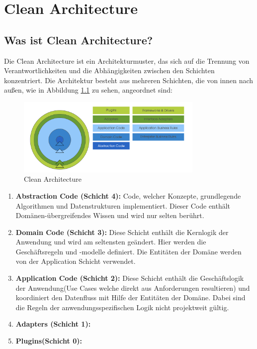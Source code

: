 \chapter{Clean Architecture}
\section{Was ist Clean Architecture?}
Die Clean Architecture ist ein Architekturmuster, das sich auf die Trennung von Verantwortlichkeiten und die Abhängigkeiten zwischen den Schichten konzentriert. Die Architektur besteht aus mehreren Schichten, die von innen nach außen, wie in Abbildung \ref{fig:cleanArchitecture} zu sehen, angeordnet sind:

\begin{figure}[h]
    \centering
    \includegraphics[width=0.8\textwidth]{Bilder/CA.png}
    \caption{Clean Architecture \cite{clean.2023}}
    \label{fig:cleanArchitecture}
\end{figure}

\begin{enumerate}
    \item \textbf{Abstraction Code (Schicht 4):} Code, welcher Konzepte, grundlegende Algorithmen und Datenstrukturen implementiert. Dieser Code enthält Domänen-übergreifendes Wissen und wird nur selten berührt.
    \item \textbf{Domain Code (Schicht 3):} Diese Schicht enthält die Kernlogik der Anwendung und wird am seltensten geändert. Hier werden die Geschäftsregeln und -modelle definiert. Die Entitäten der Domäne  werden von der Application Schicht verwendet.
    \item \textbf{Application Code (Schicht 2):} Diese Schicht enthält die Geschäftslogik der Anwendung(Use Cases welche direkt aus Anforderungen resultieren) und koordiniert den Datenfluss mit Hilfe der Entitäten der Domäne. Dabei sind die Regeln der anwendungsspezifischen Logik nicht projektweit gültig.  
    \item \textbf{Adapters (Schicht 1):}
    \item \textbf{Plugins(Schicht 0):}
\end{enumerate}

